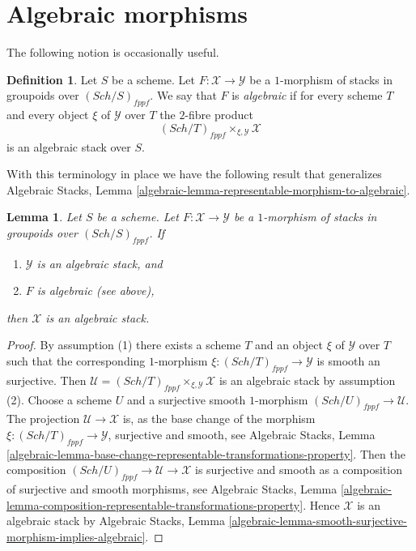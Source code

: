 \documentclass{stacks-project}
\theoremstyle{plain}
\newtheorem{lemma}[subsection]{Lemma}
\theoremstyle{definition}
\newtheorem{definition}[subsection]{Definition}
\theoremstyle{remark}
\numberwithin{equation}{subsection}
\def\Sch{\mathit{Sch}}
\begin{document}
\section{Algebraic morphisms}
\label{section-algebraic}

\noindent
The following notion is occasionally useful.

\begin{definition}
\label{definition-algebraic}
Let $S$ be a scheme. Let $F : \mathcal{X} \to \mathcal{Y}$ be a
$1$-morphism of stacks in groupoids over $(\Sch/S)_{fppf}$.
We say that $F$ is {\it algebraic} if for every scheme $T$ and every
object $\xi$ of $\mathcal{Y}$ over $T$ the $2$-fibre product
$$
(\Sch/T)_{fppf} \times_{\xi, \mathcal{Y}} \mathcal{X}
$$
is an algebraic stack over $S$.
\end{definition}

\noindent
With this terminology in place we have the following result that generalizes
Algebraic Stacks, Lemma
\ref{algebraic-lemma-representable-morphism-to-algebraic}.

\begin{lemma}
\label{lemma-algebraic-morphism-to-algebraic}
Let $S$ be a scheme.
Let $F : \mathcal{X} \to \mathcal{Y}$ be a $1$-morphism of
stacks in groupoids over $(\Sch/S)_{fppf}$. If
\begin{enumerate}
\item $\mathcal{Y}$ is an algebraic stack, and
\item $F$ is algebraic (see above),
\end{enumerate}
then $\mathcal{X}$ is an algebraic stack.
\end{lemma}

\begin{proof}
By assumption (1) there exists a scheme $T$ and an object
$\xi$ of $\mathcal{Y}$ over $T$ such that the corresponding
$1$-morphism $\xi : (\Sch/T)_{fppf} \to \mathcal{Y}$
is smooth an surjective. Then
$\mathcal{U} = (\Sch/T)_{fppf} \times_{\xi, \mathcal{Y}} \mathcal{X}$
is an algebraic stack by assumption (2).
Choose a scheme $U$ and a surjective smooth $1$-morphism
$(\Sch/U)_{fppf} \to \mathcal{U}$.
The projection $\mathcal{U} \longrightarrow \mathcal{X}$
is, as the base change of the morphism
$\xi : (\Sch/T)_{fppf} \to \mathcal{Y}$,
surjective and smooth, see
Algebraic Stacks, Lemma
\ref{algebraic-lemma-base-change-representable-transformations-property}.
Then the composition
$(\Sch/U)_{fppf} \to \mathcal{U} \to \mathcal{X}$
is surjective and smooth as a composition of surjective and smooth
morphisms, see
Algebraic Stacks, Lemma
\ref{algebraic-lemma-composition-representable-transformations-property}.
Hence $\mathcal{X}$ is an algebraic stack by
Algebraic Stacks, Lemma
\ref{algebraic-lemma-smooth-surjective-morphism-implies-algebraic}.
\end{proof}
\end{document}
